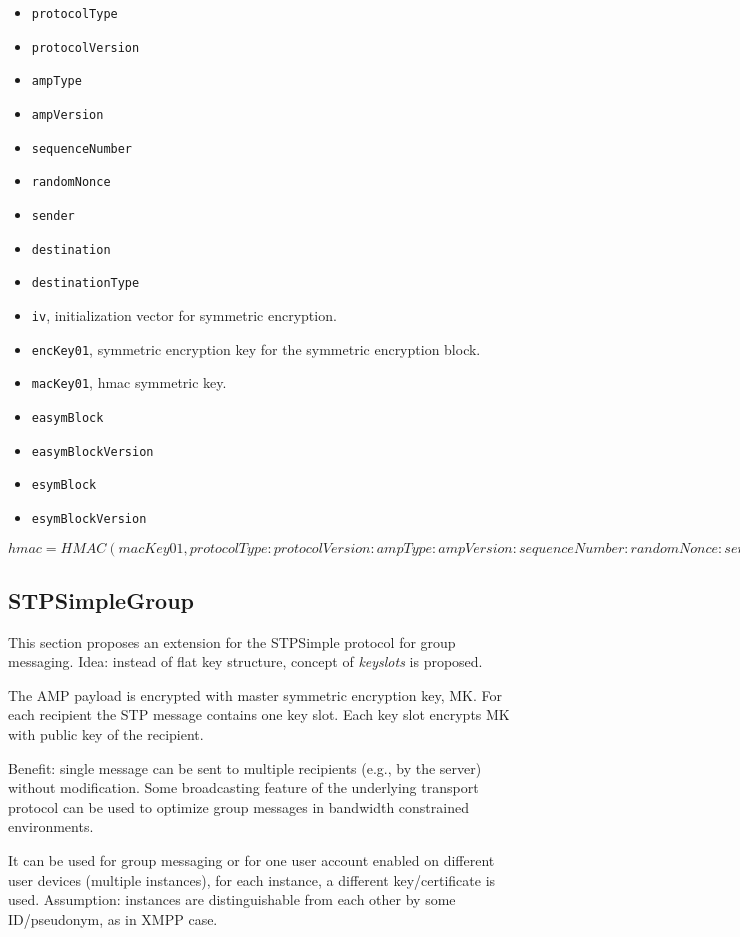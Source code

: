 \documentclass[a4paper,10pt]{article}
\begin{document}
\begin{itemize}
\begin{itemize}
 \item \verb#protocolType#
 \item \verb#protocolVersion#
 \item \verb#ampType#
 \item \verb#ampVersion#
 \item \verb#sequenceNumber#
 \item \verb#randomNonce#
 \item \verb#sender#
 \item \verb#destination#
 \item \verb#destinationType#
 \item \verb#iv#, initialization vector for symmetric encryption.
 \item \verb#encKey01#, symmetric encryption key for the symmetric encryption block.
 \item \verb#macKey01#, hmac symmetric key.
 \item \verb#easymBlock#
 \item \verb#easymBlockVersion#
 \item \verb#esymBlock#
 \item \verb#esymBlockVersion#
\end{itemize}
  
$
hmac = HMAC(macKey01, protocolType:protocolVersion:ampType:ampVersion:sequenceNumber:randomNonce:sender:
destination:destinationType:iv:encKey01:macKey01:easymBlock:easymBlockVersion:esymBlock:esymBlockVersion)) 
$
\end{itemize}

\subsection{STPSimpleGroup}
This section proposes an extension for the STPSimple protocol for group messaging.
Idea: instead of flat key structure, concept of \emph{keyslots} is proposed.

The AMP payload is encrypted with master symmetric encryption key, MK.
For each recipient the STP message contains one key slot. Each key slot encrypts MK with 
public key of the recipient. 

Benefit: single message can be sent to multiple recipients (e.g., by the server) without modification. Some
broadcasting feature of the underlying transport protocol can be used to optimize group messages in bandwidth constrained environments.

It can be used for group messaging or for one user account enabled on different user devices (multiple instances),
for each instance, a different key/certificate is used. Assumption: instances are distinguishable from
each other by some ID/pseudonym, as in XMPP case.
\end{document}
